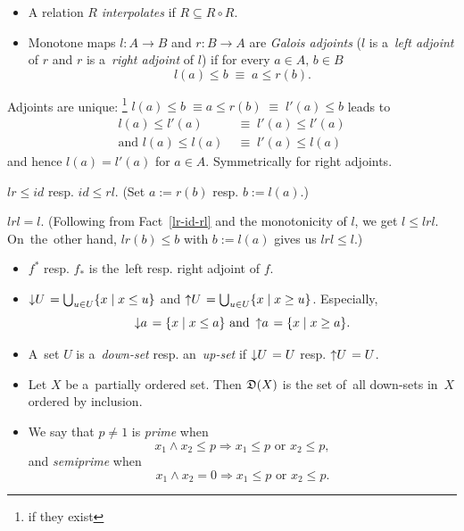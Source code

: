 \begin{itemize}
\item A relation $R$ \emph{interpolates} if $R \subseteq R \circ R$.

\item Monotone maps $l\colon A \to B$ and $r\colon B \to A$ are \emph{Galois
  adjoints\/} ($l$ is a~\emph{left adjoint\/} of $r$ and $r$ is a~\emph{right
  adjoint\/} of $l$) if for every $a\in A, \, b\in B$
  \[
    l(a) \le b \; \equiv \; a \le r(b).
  \]
\end{itemize}

\begin{rem}
  Adjoints are unique:\thinspace%
  \footnote{if they exist}
  $l(a) \le b \; \equiv a \le r(b) \; \equiv \; l'(a) \le b$ leads to
  \begin{align*}
    l(a) \le l'(a) \; &\equiv \; l'(a) \le l'(a) \\
    \text{and } l(a) \le l(a) \; &\equiv \; l'(a) \le l(a)
  \end{align*}
  and hence $l(a) = l'(a)$ for $a\in A$.
  Symmetrically for right adjoints.
\end{rem}

\begin{fact} \label{lr-id-rl}
  $lr \le id$ resp. $id \le rl$.
  (Set $a := r(b)$ resp. $b := l(a)$.)
\end{fact}

\begin{fact} \label{lrl=l}
  $lrl = l$.
  (Following from Fact~\ref{lr-id-rl} and the monotonicity of $l$, we get $l
   \le lrl$.
  On~the~other hand, $lr(b) \le b$ with $b := l(a)$ gives us $lrl \le l$.)
\end{fact}

\begin{itemize}
\item $f^*$ resp. $f_*$ is the~left resp. right adjoint of $f$.

\item $\left\downarrow U \right. = \bigcup_{u\in U} \{x \mid x \le u\}$ and
$\left\uparrow U \right. = \bigcup_{u\in U} \{x \mid x \ge u\}$.
Especially,
\[
  \left\downarrow a \right. = \{x \mid x \le a\} \text{ and } \left\uparrow a
  \right. = \{x \mid x \ge a\}.
\]

\item A~set $U$ is a~\emph{down-set\/} resp. an~\emph{up-set\/} if
$\left\downarrow U \right. = U$ resp. $\left\uparrow U \right. = U$.

\item Let $X$ be a~partially ordered set.
Then $\mathfrak{D}(X)$ is the set of~all down-sets in~$X$ ordered by inclusion.

\item We say that $p \ne 1$ is \emph{prime\/} when
\[
  x_1 \wedge x_2 \le p \Rightarrow x_1
  \le p \text{ or } x_2 \le p,
\]
and \emph{semiprime\/} when
\[
  x_1 \wedge x_2 = 0 \Rightarrow
  x_1 \le p \text{ or } x_2 \le p.
\]
\end{itemize}

